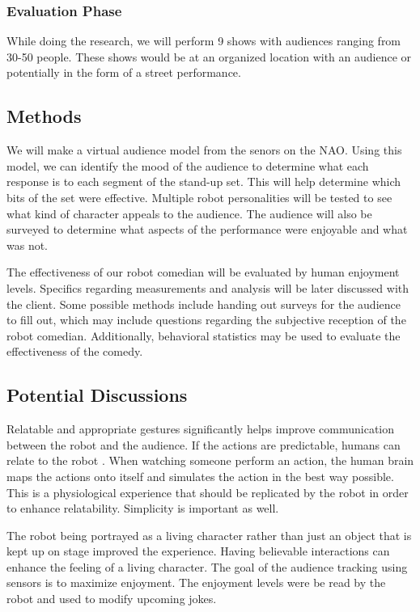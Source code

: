 \documentclass[onecolumn, draftclsnofoot,10pt, compsoc]{IEEEtran}
\begin{document}
\subsubsection{Evaluation Phase}
While doing the research, we will perform 9 shows with audiences ranging from 30-50 people. These shows would be at an organized location with an audience or potentially in the form of a street performance.

\subsection{Methods}
We will make a virtual audience model from the senors on the NAO. Using this model, we can identify the mood of the audience to determine what each response is to each segment of the stand-up set. This will help determine which bits of the set were effective. Multiple robot personalities will be tested to see what kind of character appeals to the audience. The audience will also be surveyed to determine what aspects of the performance were enjoyable and what was not.

The effectiveness of our robot comedian will be evaluated by human enjoyment levels. Specifics regarding measurements and analysis will be later discussed with the client. Some possible methods include handing out surveys for the audience to fill out, which may include questions regarding the subjective reception of the robot comedian. Additionally, behavioral statistics may be used to evaluate the effectiveness of the comedy.

\subsection{Potential Discussions}


Relatable and appropriate gestures significantly helps improve communication between the robot and the audience. If the actions are predictable, humans can relate to the robot {\cite{KnightEightLessons:2011}}.
When watching someone perform an action, the human brain maps the actions onto itself and simulates the action in the best way possible. This is a physiological experience that should be replicated by the robot in order to enhance relatability. Simplicity is important as well.

The robot being portrayed as a living character rather than just an object that is kept up on stage improved the experience. Having believable interactions can enhance the feeling of a living character.
The goal of the audience tracking using sensors is to maximize enjoyment. The enjoyment levels were be read by the robot and used to modify upcoming jokes.
\end{document}

